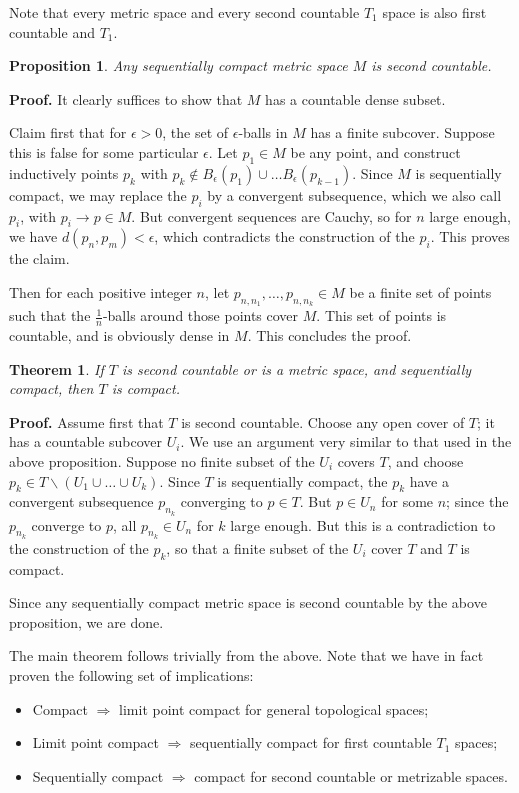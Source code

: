 \documentclass[12pt]{article}
\newtheorem{thm}{Theorem}
\newtheorem{prop}{Proposition}
\begin{document}
Note that every metric space and every second countable $T_1$ space is also first countable and $T_1$.

\begin{prop} Any sequentially compact metric space $M$ is second countable.
\end{prop}
\textbf{Proof. }
It clearly suffices to show that $M$ has a countable dense subset.

Claim first that for $\epsilon>0$, the set of $\epsilon$-balls in $M$ has a finite subcover. Suppose this is false for some particular $\epsilon$. Let $p_1\in M$ be any point, and construct inductively points $p_k$ with $p_k\notin B_{\epsilon}(p_1)\cup\ldots B_{\epsilon}(p_{k-1})$. Since $M$ is sequentially compact, we may replace the $p_i$ by a convergent subsequence, which we also call $p_i$, with $p_i\to p\in M$. But convergent sequences are Cauchy, so for $n$ large enough, we have $d(p_n,p_m)<\epsilon$, which contradicts the construction of the $p_i$. This proves the claim.

Then for each positive integer $n$, let $p_{n,n_1},\ldots,{p_{n,n_k}}\in M$ be a finite set of points such that the $\frac{1}{n}$-balls around those points cover $M$. This set of points is countable, and is obviously dense in $M$. This concludes the proof.

\begin{thm} If $T$ is second countable or is a metric space, and sequentially compact, then $T$ is compact.
\end{thm}

\textbf{Proof. } Assume first that $T$ is second countable. Choose any open cover of $T$; it has a countable subcover $U_i$. We use an argument very similar to that used in the above proposition. Suppose no finite subset of the $U_i$ covers $T$, and choose $p_k\in T\backslash(U_1\cup\ldots\cup U_k)$. Since $T$ is sequentially compact, the $p_k$ have a convergent subsequence $p_{n_k}$ converging to $p\in T$. But $p\in U_n$ for some $n$; since the $p_{n_k}$ converge to $p$, all $p_{n_k}\in U_n$ for $k$ large enough. But this is a contradiction to the construction of the $p_k$, so that a finite subset of the $U_i$ cover $T$ and $T$ is compact.

Since any sequentially compact metric space is second countable by the above proposition, we are done.


The main theorem follows trivially from the above. Note that we have in fact proven the following set of implications:
\begin{itemize}
\item Compact $\Rightarrow$ limit point compact for general topological spaces;
\item Limit point compact $\Rightarrow$ sequentially compact for first countable $T_1$ spaces;
\item Sequentially compact $\Rightarrow$ compact for second countable or metrizable spaces.
\end{itemize}

\end{document}
